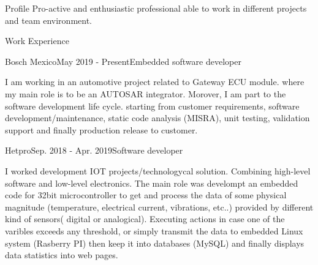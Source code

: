 \documentclass{resume} %
\begin{document}
\begin{rSection}{Profile}
Pro-active and enthusiastic professional able to work in different projects and team environment.
\end{rSection}



\begin{rSection}{Work Experience}

\begin{rSubsection}{Bosch Mexico}{May 2019 - Present}{Embedded software developer}{}
\item I am working in an automotive project related to Gateway ECU module. where my main role is to be an AUTOSAR integrator. Morover, I am part to the software development life cycle. starting from customer requirements, software development/maintenance, static code analysis (MISRA), unit testing, validation support and finally production release to customer.


\end{rSubsection}

\begin{rSubsection}{Hetpro}{Sep. 2018 - Apr. 2019}{Software developer}{}
\item  I worked development IOT projects/technologycal solution. Combining high-level software and low-level electronics. The main role was develompt an embedded code for 32bit microcontroller to get and process the data of some physical magnitude (temperature, electrical current, vibrations, etc..) provided by different kind of sensors( digital or analogical). Executing actions in case one of the varibles exceeds any threshold, or simply transmit the data to embedded Linux system (Rasberry PI) then  keep it into databases (MySQL) and finally displays data statistics into web pages.

\end{rSubsection}

\end{rSection}
\end{document}

